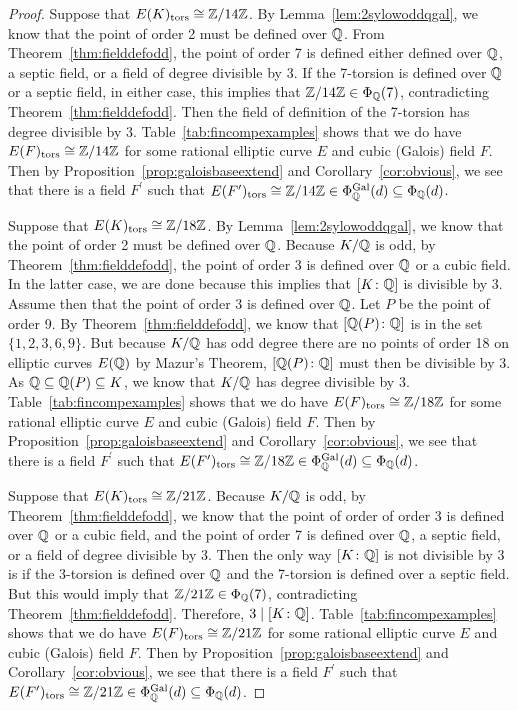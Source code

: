 \begin{proof}
Suppose that $E(K)_{\text{tors}} \cong \mathbb{Z}/14\mathbb{Z}$. By Lemma~\ref{lem:2sylowoddqgal}, we know that the point of order 2 must be defined over $\mathbb{Q}$. From Theorem~\ref{thm:fielddefodd}, the point of order 7 is defined either defined over $\mathbb{Q}$, a septic field, or a field of degree divisible by 3. If the 7-torsion is defined over $\mathbb{Q}$ or a septic field, in either case, this implies that $\mathbb{Z}/14\mathbb{Z} \in \Phi_{\mathbb{Q}}(7)$, contradicting Theorem~\ref{thm:fielddefodd}. Then the field of definition of the 7-torsion has degree divisible by 3. Table~\ref{tab:fincompexamples} shows that we do have $E(F)_{\text{tors}} \cong \mathbb{Z}/14\mathbb{Z}$ for some rational elliptic curve $E$ and cubic (Galois) field $F$. Then by Proposition~\ref{prop:galoisbaseextend} and Corollary~\ref{cor:obvious}, we see that there is a field $F^\prime$ such that $E(F^\prime)_{\text{tors}} \cong \mathbb{Z}/14\mathbb{Z} \in \Phi_{\mathbb{Q}}^{\operatorname{Gal}}(d) \subseteq \Phi_{\mathbb{Q}}(d)$.   

Suppose that $E(K)_{\text{tors}} \cong \mathbb{Z}/18\mathbb{Z}$. By Lemma~\ref{lem:2sylowoddqgal}, we know that the point of order 2 must be defined over $\mathbb{Q}$. Because $K/\mathbb{Q}$ is odd, by Theorem~\ref{thm:fielddefodd}, the point of order 3 is defined over $\mathbb{Q}$ or a cubic field. In the latter case, we are done because this implies that $[K \colon \mathbb{Q}]$ is divisible by 3. Assume then that the point of order 3 is defined over $\mathbb{Q}$. Let $P$ be the point of order 9. By Theorem~\ref{thm:fielddefodd}, we know that $[\mathbb{Q}(P) \colon \mathbb{Q}]$ is in the set $\{1, 2, 3, 6, 9 \}$. But because $K/\mathbb{Q}$ has odd degree there are no points of order 18 on elliptic curves $E(\mathbb{Q})$ by Mazur's Theorem, $[\mathbb{Q}(P) \colon \mathbb{Q}]$ must then be divisible by 3. As $\mathbb{Q} \subseteq \mathbb{Q}(P) \subseteq K$, we know that $K/\mathbb{Q}$ has degree divisible by 3. Table~\ref{tab:fincompexamples} shows that we do have $E(F)_{\text{tors}} \cong \mathbb{Z}/18\mathbb{Z}$ for some rational elliptic curve $E$ and cubic (Galois) field $F$. Then by Proposition~\ref{prop:galoisbaseextend} and Corollary~\ref{cor:obvious}, we see that there is a field $F^\prime$ such that $E(F^\prime)_{\text{tors}} \cong \mathbb{Z}/18\mathbb{Z} \in \Phi_{\mathbb{Q}}^{\operatorname{Gal}}(d) \subseteq \Phi_{\mathbb{Q}}(d)$.   

Suppose that $E(K)_{\text{tors}} \cong \mathbb{Z}/21\mathbb{Z}$. Because $K/\mathbb{Q}$ is odd, by Theorem~\ref{thm:fielddefodd}, we know that the point of order of order 3 is defined over $\mathbb{Q}$ or a cubic field, and the point of order 7 is defined over $\mathbb{Q}$, a septic field, or a field of degree divisible by 3. Then the only way $[K \colon \mathbb{Q}]$ is not divisible by 3 is if the 3-torsion is defined over $\mathbb{Q}$ and the 7-torsion is defined over a septic field. But this would imply that $\mathbb{Z}/21\mathbb{Z} \in \Phi_{\mathbb{Q}}(7)$, contradicting Theorem~\ref{thm:fielddefodd}. Therefore, $3 \mid [K \colon \mathbb{Q}]$. Table~\ref{tab:fincompexamples} shows that we do have $E(F)_{\text{tors}} \cong \mathbb{Z}/21\mathbb{Z}$ for some rational elliptic curve $E$ and cubic (Galois) field $F$. Then by Proposition~\ref{prop:galoisbaseextend} and Corollary~\ref{cor:obvious}, we see that there is a field $F^\prime$ such that $E(F^\prime)_{\text{tors}} \cong \mathbb{Z}/21\mathbb{Z} \in \Phi_{\mathbb{Q}}^{\operatorname{Gal}}(d) \subseteq \Phi_{\mathbb{Q}}(d)$.   


\end{proof}
